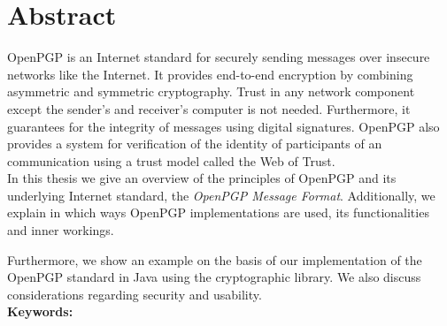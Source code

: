 

\chapter*{Abstract}
\label{cha:abstract}


{OpenPGP} is an Internet standard for securely sending messages over insecure networks like the Internet. It provides end-to-end encryption by combining asymmetric and symmetric cryptography. Trust in any network component except the sender's and receiver's computer is not needed. Furthermore, it guarantees for the integrity of messages using digital signatures. OpenPGP also provides a system for verification of the identity of participants of an communication using a trust model called the Web of Trust. \\


In this thesis we give an overview of the principles of {OpenPGP} and its underlying Internet standard, the \textit{OpenPGP Message Format}. 
Additionally, we explain in which ways OpenPGP implementations are used, its functionalities and inner workings.

Furthermore, we show an example on the basis of our implementation of the OpenPGP standard in Java using the  cryptographic library.
We also discuss considerations regarding security and usability.
\\



\textbf{Keywords:} \mykeywords

